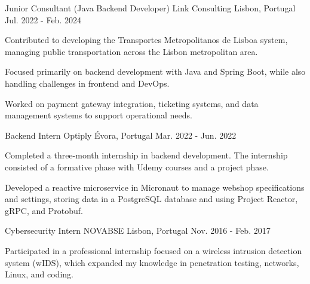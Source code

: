 \begin{cventries}
  \vspace{0.4cm}


  \cventry
  {Junior Consultant (Java Backend Developer)} %
  {Link Consulting} %
  {Lisbon, Portugal} %
  {Jul. 2022 - Feb. 2024} %
  { %
    \begin{cvitems}
      \item {Contributed to developing the Transportes Metropolitanos de Lisboa system, managing public transportation across the Lisbon metropolitan area.}
      \item {Focused primarily on backend development with Java and Spring Boot, while also handling challenges in frontend and DevOps.}
      \item {Worked on payment gateway integration, ticketing systems, and data management systems to support operational needs.}
    \end{cvitems}
  }

  \vspace{0.4cm}


  \cventry
  {Backend Intern} %
  {Optiply} %
  {Évora, Portugal} %
  {Mar. 2022 - Jun. 2022} %
  { %
    \begin{cvitems}
      \item {Completed a three-month internship in backend development. The internship consisted of a formative phase with Udemy courses and a project phase.}
      \item {Developed a reactive microservice in Micronaut to manage webshop specifications and settings, storing data in a PostgreSQL database and using Project Reactor, gRPC, and Protobuf.}
    \end{cvitems}
  }

  \vspace{0.4cm}


  \cventry
  {Cybersecurity Intern} %
  {NOVABSE} %
  {Lisbon, Portugal} %
  {Nov. 2016 - Feb. 2017} %
  { %
    \begin{cvitems}
      \item {Participated in a professional internship focused on a wireless intrusion detection system (wIDS), which expanded my knowledge in penetration testing, networks, Linux, and coding.}
    \end{cvitems}
  }


\end{cventries}
